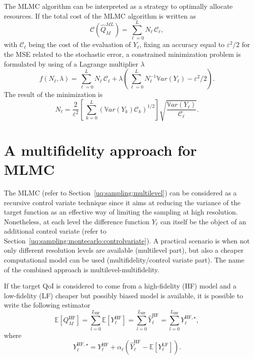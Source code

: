 The MLMC algorithm can be interpreted as a strategy to optimally allocate resources. If the total cost of the
MLMC algorithm is written as  
\begin{equation}\label{EQ: MLMC cost}
\mathcal{C}(\hat{Q}^{ML}_{M}) = \sum_{\ell=0}^{L} N_\ell \, \mathcal{C}_{\ell},
\end{equation}
with $\mathcal{C}_{\ell}$ being the cost of the evaluation of $Y_\ell$, fixing an accuracy equal to $\varepsilon^2/2$ 
for the MSE related to the stochastic error, a constrained minimization 
problem is formulated by using of a Lagrange multiplier $\lambda$
\begin{equation}\label{EQ:mlmc_optimization}
 f(N_\ell,\lambda) = \sum_{\ell=0}^{L} N_\ell \, \mathcal{C}_{\ell} 
                   + \lambda \left( \sum_{\ell=0}^{L} N_\ell^{-1} \mathbb{V}ar\left({Y_\ell}\right) - \varepsilon^2/2 \right). 
\end{equation}
The result of the minimization is
\begin{equation}\label{EQ: MLMC nl}
N_{\ell} = \frac{2}{\varepsilon^2} \left[ \, \sum_{k=0}^L \left( \mathbb{V}ar\left(Y_k\right) \mathcal{C}_k \right)^{1/2} \right] 
               \sqrt{\frac{ \mathbb{V}ar\left({Y_\ell}\right) }{\mathcal{C}_{\ell}}}.
\end{equation}


\section{A multifidelity approach for MLMC} \label{uq:sampling:multifidelity}
The MLMC (refer to Section~\ref{uq:sampling:multilevel}) can be considered as a recursive control variate technique 
since it aims at reducing the variance of the target function as an effective way of limiting the sampling at high 
resolution. Nonetheless, at each level the difference function $Y_\ell$ can itself be the object of an additional 
control variate (refer to Section~\ref{uq:sampling:montecarlo:controlvariate}). A practical scenario is when not only 
different resolution levels are available (multilevel part), but also a cheaper computational model can be used 
(multifidelity/control variate part). The name of the combined approach is multilevel-multifidelity.

If the target QoI is considered to come from a high-fidelity (HF) model and a low-fidelity (LF) cheaper but possibly biased
model is available, it is possible to write the following estimator
\begin{equation}\label{EQ: MLMF estimator}
 \mathbb{E}\left[Q_M^{\mathrm{HF}}\right] = \sum_{l=0}^{L_{\mathrm{HF}}} \mathbb{E}\left[Y^{\mathrm{HF}}_{\ell}\right] 
                                          = \sum_{l=0}^{L_{\mathrm{HF}}} \hat{Y}^{\mathrm{HF}}_{\ell} = \sum_{l=0}^{L_{\mathrm{HF}}} Y^{{\mathrm{HF}},\star}_{\ell},
\end{equation}
where
\begin{equation}
 Y^{{\mathrm{HF}},\star}_{\ell} = Y^{\mathrm{HF}}_{\ell} + \alpha_\ell \left( \hat{Y}^{\mathrm{HF}}_{\ell} - \mathbb{E}\left[{Y^{\mathrm{LF}}_{\ell}}\right] \right).
\end{equation}

